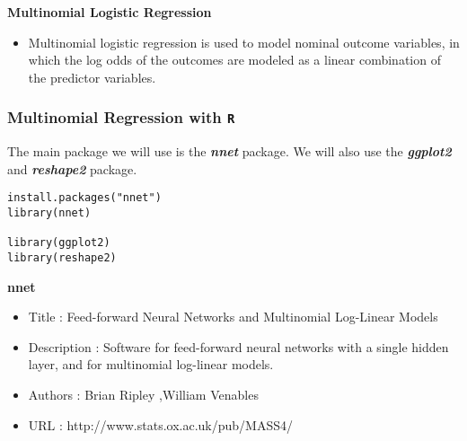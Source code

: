 \documentclass[00-GLMregslides.tex]{subfiles}
\begin{document}
	

	
\begin{frame}
\Large
	
\textbf{Multinomial Logistic Regression}\\
\bigskip
\begin{itemize}
\item Multinomial logistic regression is used to model nominal outcome variables, in which the log odds of the outcomes are modeled as a linear combination of the predictor variables.
\end{itemize}
 
\end{frame}

\begin{frame}[fragile]

\frametitle{Multinomial Regression with \texttt{R}}
\Large
The main package we will use is the \textbf{\textit{nnet}} package. We will also use the \textbf{\textit{ggplot2}} and \textbf{\textit{reshape2}} package. 

\begin{framed}
\begin{verbatim}
install.packages("nnet")
library(nnet)

library(ggplot2)
library(reshape2)
\end{verbatim}
\end{framed}



\end{frame}
\begin{frame}
\textbf{nnet}

\begin{itemize}
\item Title : Feed-forward Neural Networks and Multinomial Log-Linear Models
\item Description : Software for feed-forward neural networks with a single
hidden layer, and for multinomial log-linear models.
\item Authors : Brian Ripley ,William Venables 
\item URL : http://www.stats.ox.ac.uk/pub/MASS4/
\end{itemize}

\end{frame}
\end{document}
